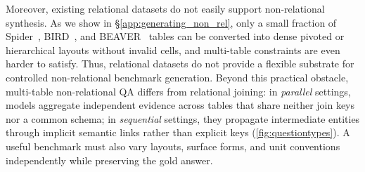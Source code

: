 

Moreover, existing relational datasets do not easily support non-relational synthesis. As we show in \S\ref{app:generating_non_rel}, only a small fraction of Spider~\cite{1.6}, BIRD~\cite{1.20}, and BEAVER~\cite{1.30} tables can be converted into dense pivoted or hierarchical layouts without invalid cells, and multi-table constraints are even harder to satisfy. Thus, relational datasets do not provide a flexible substrate for controlled non-relational benchmark generation. Beyond this practical obstacle, multi-table non-relational QA differs from relational joining: in \emph{parallel} settings, models aggregate independent evidence across tables that share neither join keys nor a common schema; in \emph{sequential} settings, they propagate intermediate entities through implicit semantic links rather than explicit keys (\autoref{fig:questiontypes}). A useful benchmark must also vary layouts, surface forms, and unit conventions independently while preserving the gold answer.

